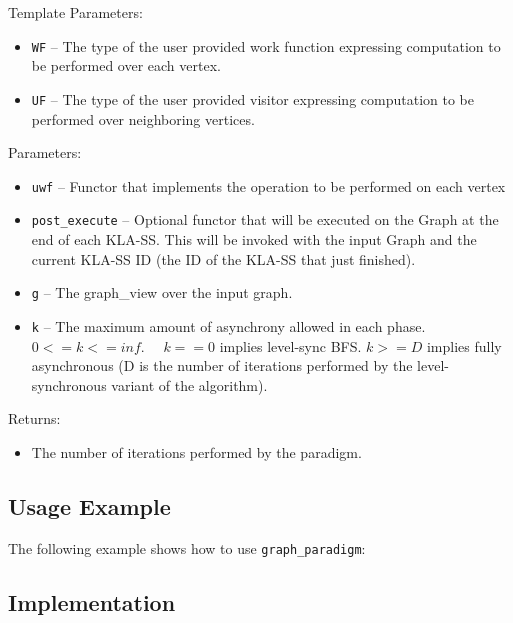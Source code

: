 Template Parameters:
\begin{itemize}
\item
\texttt{WF} --
The type of the user provided work function expressing computation to be performed over each vertex.
\item
\texttt{UF} --
The type of the user provided visitor expressing computation to be performed over neighboring vertices.
\end{itemize}

Parameters:
\begin{itemize}
\item
\texttt{uwf} --
Functor that implements the operation to be performed on each vertex
\item
\texttt{post\_execute} --
Optional functor that will be executed on the Graph at the end of each KLA-SS. This will be invoked with the input Graph and the current KLA-SS ID (the ID of the KLA-SS that just finished).
\item
\texttt{g} --
The graph\_view over the input graph.
\item
\texttt{k} --
The maximum amount of asynchrony allowed in each phase. $0 <= k <= inf.$ \ \ $k == 0$ implies level-sync BFS. $k >= D$ implies fully asynchronous (D is the number of iterations performed by the level-synchronous variant of the algorithm).
\end{itemize}

Returns:
\begin{itemize}
\item
The number of iterations performed by the paradigm.
\end{itemize}

\subsection{Usage Example} \label{sec-graf-para-alg-use}

The following example shows how to use 
\texttt{graph\_paradigm}:


\subsection{Implementation} \label{sec-graf-para-alg-impl}

